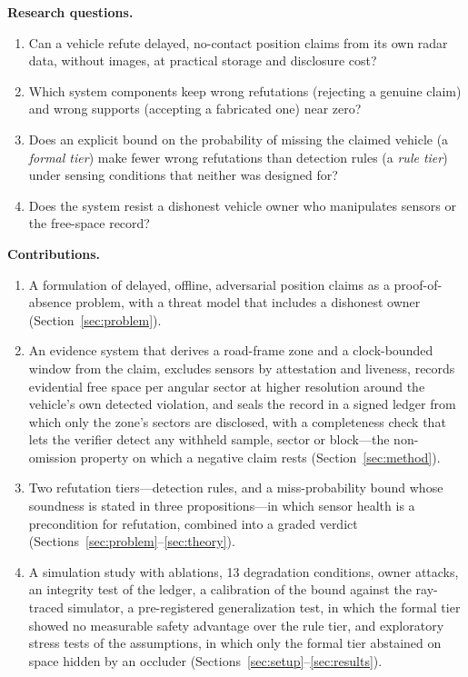 \textbf{Research questions.}
\begin{enumerate}
\item[\textbf{RQ1.}] Can a vehicle refute delayed, no-contact position claims from its own radar data, without images, at practical storage and disclosure cost?
\item[\textbf{RQ2.}] Which system components keep wrong refutations (rejecting a genuine claim) and wrong supports (accepting a fabricated one) near zero?
\item[\textbf{RQ3.}] Does an explicit bound on the probability of missing the claimed vehicle (a \emph{formal tier}) make fewer wrong refutations than detection rules (a \emph{rule tier}) under sensing conditions that neither was designed for?
\item[\textbf{RQ4.}] Does the system resist a dishonest vehicle owner who manipulates sensors or the free-space record?
\end{enumerate}

\textbf{Contributions.}
\begin{enumerate}
\item A formulation of delayed, offline, adversarial position claims as a proof-of-absence problem, with a threat model that includes a dishonest owner (Section~\ref{sec:problem}).
\item An evidence system that derives a road-frame zone and a clock-bounded window from the claim, excludes sensors by attestation and liveness, records evidential free space per angular sector at higher resolution around the vehicle's own detected violation, and seals the record in a signed ledger from which only the zone's sectors are disclosed, with a completeness check that lets the verifier detect any withheld sample, sector or block---the non-omission property on which a negative claim rests (Section~\ref{sec:method}).
\item Two refutation tiers---detection rules, and a miss-probability bound whose soundness is stated in three propositions---in which sensor health is a precondition for refutation, combined into a graded verdict (Sections~\ref{sec:problem}--\ref{sec:theory}).
\item A simulation study with ablations, 13 degradation conditions, owner attacks, an integrity test of the ledger, a calibration of the bound against the ray-traced simulator, a pre-registered generalization test, in which the formal tier showed no measurable safety advantage over the rule tier, and exploratory stress tests of the assumptions, in which only the formal tier abstained on space hidden by an occluder (Sections~\ref{sec:setup}--\ref{sec:results}).
\end{enumerate}

